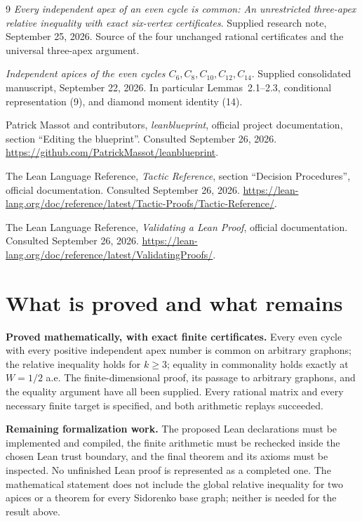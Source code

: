 \begin{thebibliography}{9}
\emph{Every independent apex of an even cycle is common: An unrestricted three-apex
relative inequality with exact six-vertex certificates}.
Supplied research note, September 25, 2026.  Source of the four unchanged rational
certificates and the universal three-apex argument.

\emph{Independent apices of the even cycles $C_6,C_8,C_{10},C_{12},C_{14}$}.
Supplied consolidated manuscript, September 22, 2026.  In particular Lemmas~2.1--2.3,
conditional representation (9), and diamond moment identity (14).

Patrick Massot and contributors, \emph{leanblueprint}, official project documentation,
section ``Editing the blueprint''.  Consulted September 26, 2026.
\url{https://github.com/PatrickMassot/leanblueprint}.

The Lean Language Reference, \emph{Tactic Reference}, section ``Decision Procedures'',
official documentation.  Consulted September 26, 2026.
\url{https://lean-lang.org/doc/reference/latest/Tactic-Proofs/Tactic-Reference/}.

The Lean Language Reference, \emph{Validating a Lean Proof}, official documentation.
Consulted September 26, 2026.
\url{https://lean-lang.org/doc/reference/latest/ValidatingProofs/}.
\end{thebibliography}

\clearpage
\section{What is proved and what remains}
\label{sec:status}
\textbf{Proved mathematically, with exact finite certificates.}
Every even cycle with every positive independent apex number is common on arbitrary
graphons; the relative inequality holds for $k\ge3$; equality in commonality holds exactly
at $W=1/2$ a.e.  The finite-dimensional proof, its passage to arbitrary graphons, and the
equality argument have all been supplied.  Every rational matrix and every necessary
finite target is specified, and both arithmetic replays succeeded.

\textbf{Remaining formalization work.}
The proposed Lean declarations must be implemented and compiled, the finite arithmetic
must be rechecked inside the chosen Lean trust boundary, and the final theorem and its
axioms must be inspected.  No unfinished Lean proof is represented as a completed one.
The mathematical statement does not include the global relative inequality for two apices
or a theorem for every Sidorenko base graph; neither is needed for the result above.


